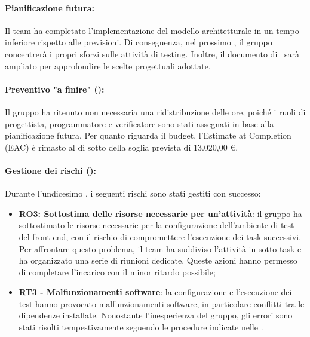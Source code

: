 \paragraph*{Pianificazione futura:}
\par Il team ha completato l'implementazione del modello architetturale in un tempo inferiore rispetto alle previsioni. Di conseguenza, nel prossimo , il gruppo concentrerà i propri sforzi sulle attività di testing. Inoltre, il documento di \ST\ sarà ampliato per approfondire  le scelte progettuali adottate.

\paragraph*{Preventivo "a finire" ():}
\par Il gruppo ha ritenuto non necessaria una ridistribuzione delle ore, poiché i ruoli di progettista, programmatore e verificatore sono stati assegnati in base alla pianificazione futura. Per quanto riguarda il budget, l'Estimate at Completion (EAC) è rimasto al di sotto della soglia prevista di 13.020,00 €.

\paragraph*{Gestione dei rischi ():}
\par Durante l'undicesimo , i seguenti rischi sono stati gestiti con successo:
\begin{itemize}
  \item \textbf{RO3: Sottostima delle risorse necessarie per un'attività}: il gruppo ha sottostimato le risorse necessarie per la configurazione dell'ambiente di test del front-end, con il rischio di compromettere l'esecuzione dei task successivi. Per affrontare questo problema, il team ha suddiviso l'attività in sotto-task e ha organizzato una serie di riunioni dedicate. Queste azioni hanno permesso di completare l'incarico con il minor ritardo possibile;
  \item \textbf{RT3 - Malfunzionamenti software}: la configurazione e l'esecuzione dei test hanno provocato malfunzionamenti software, in particolare conflitti tra le dipendenze installate. Nonostante l'inesperienza del gruppo, gli errori sono stati risolti tempestivamente seguendo le procedure indicate nelle \NdP.
\end{itemize}